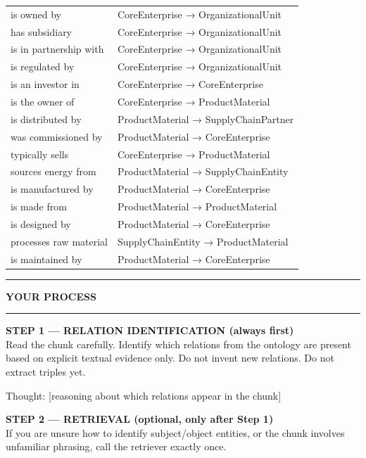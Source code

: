 \begin{appendices}
\begin{tcolorbox}[sysprompt, title=System Prompt]
\medskip
\begin{tabular}{@{}l@{\hspace{1em}}l}
is owned by            & CoreEnterprise    → OrganizationalUnit \\
has subsidiary         & CoreEnterprise    → OrganizationalUnit \\
is in partnership with & CoreEnterprise    → OrganizationalUnit \\
is regulated by        & CoreEnterprise    → OrganizationalUnit \\
is an investor in      & CoreEnterprise    → CoreEnterprise     \\
is the owner of        & CoreEnterprise    → ProductMaterial    \\
is distributed by      & ProductMaterial   → SupplyChainPartner \\
was commissioned by    & ProductMaterial   → CoreEnterprise     \\
typically sells        & CoreEnterprise    → ProductMaterial    \\
sources energy from    & ProductMaterial   → SupplyChainEntity  \\
is manufactured by     & ProductMaterial   → CoreEnterprise     \\
is made from           & ProductMaterial   → ProductMaterial    \\
is designed by         & ProductMaterial   → CoreEnterprise     \\
processes raw material & SupplyChainEntity → ProductMaterial    \\
is maintained by       & ProductMaterial   → CoreEnterprise     \\
\end{tabular}

\medskip
\hrule
\medskip
\textbf{YOUR PROCESS}
\medskip
\hrule

\medskip
\textbf{STEP 1 — RELATION IDENTIFICATION (always first)}\\
Read the chunk carefully. Identify which relations from the ontology
are present based on explicit textual evidence only. Do not invent
new relations. Do not extract triples yet.

\smallskip
Thought: [reasoning about which relations appear in the chunk]

\medskip
\textbf{STEP 2 — RETRIEVAL (optional, only after Step 1)}\\
If you are unsure how to identify subject/object entities, or the
chunk involves unfamiliar phrasing, call the retriever exactly once.


\end{tcolorbox}
\end{appendices}
